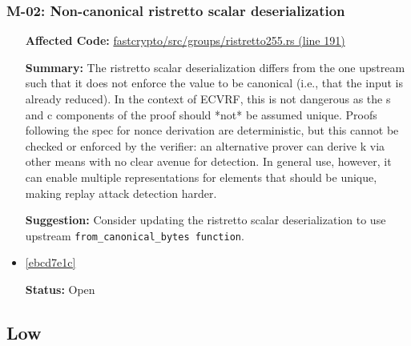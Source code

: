 \subsubsection*{M-02: Non-canonical ristretto scalar deserialization}
\begin{itemize}[align=left]
\item[\textbf{Affected Code:}] \href{https://github.com/MystenLabs/fastcrypto/blob/963205c6d0538fe548b8b10037cf87a53af6f424/fastcrypto/src/groups/ristretto255.rs#L191}{fastcrypto/src/groups/ristretto255.rs (line 191)}
\item[\textbf{Summary:}] The ristretto scalar deserialization differs from the one upstream such that it does not enforce the value to be canonical (i.e., that the input is already reduced). In the context of ECVRF, this is not dangerous as the s and c components of the proof should *not* be assumed unique. Proofs following the spec for nonce derivation are deterministic, but this cannot be checked or enforced by the verifier: an alternative prover can derive k via other means with no clear avenue for detection. In general use, however, it can enable multiple representations for elements that should be unique, making replay attack detection harder.
\item[\textbf{Suggestion:}] Consider updating the ristretto scalar deserialization to use upstream \lstinline{from_canonical_bytes function}.
\item[\textbf{Suggested Fix:}] \href{https://github.com/MystenLabs/fastcrypto/pull/543/commits/ebcd7e1c8e6f0bbf48667f995017151a20289886}{[ebcd7e1c]}
\item[\textbf{Status:}] Open
\end{itemize}

\subsection{Low}
